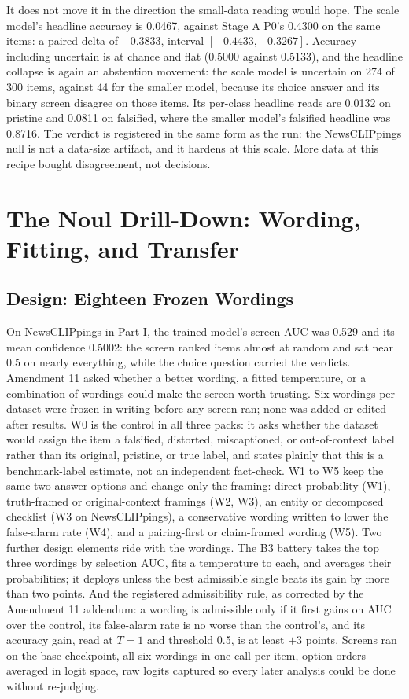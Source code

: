 \documentclass{article} %
\begin{document}
It does not move it in the direction the small-data reading would hope. The scale model's headline accuracy is 0.0467, against Stage A P0's 0.4300 on the same items: a paired delta of \(-0.3833\), interval \([-0.4433, -0.3267]\). Accuracy including uncertain is at chance and flat (0.5000 against 0.5133), and the headline collapse is again an abstention movement: the scale model is uncertain on 274 of 300 items, against 44 for the smaller model, because its choice answer and its binary screen disagree on those items. Its per-class headline reads are 0.0132 on pristine and 0.0811 on falsified, where the smaller model's falsified headline was 0.8716. The verdict is registered in the same form as the run: the NewsCLIPpings null is not a data-size artifact, and it hardens at this scale. More data at this recipe bought disagreement, not decisions.


\section{The Noul Drill-Down: Wording, Fitting, and Transfer}
\label{sec:noul}
\subsection{Design: Eighteen Frozen Wordings}
On NewsCLIPpings in Part I, the trained model's screen AUC was 0.529 and its mean confidence 0.5002: the screen ranked items almost at random and sat near 0.5 on nearly everything, while the choice question carried the verdicts. Amendment 11 asked whether a better wording, a fitted temperature, or a combination of wordings could make the screen worth trusting. Six wordings per dataset were frozen in writing before any screen ran; none was added or edited after results. W0 is the control in all three packs: it asks whether the dataset would assign the item a falsified, distorted, miscaptioned, or out-of-context label rather than its original, pristine, or true label, and states plainly that this is a benchmark-label estimate, not an independent fact-check. W1 to W5 keep the same two answer options and change only the framing: direct probability (W1), truth-framed or original-context framings (W2, W3), an entity or decomposed checklist (W3 on NewsCLIPpings), a conservative wording written to lower the false-alarm rate (W4), and a pairing-first or claim-framed wording (W5). Two further design elements ride with the wordings. The B3 battery takes the top three wordings by selection AUC, fits a temperature to each, and averages their probabilities; it deploys unless the best admissible single beats its gain by more than two points. And the registered admissibility rule, as corrected by the Amendment 11 addendum: a wording is admissible only if it first gains on AUC over the control, its false-alarm rate is no worse than the control's, and its accuracy gain, read at \(T=1\) and threshold 0.5, is at least \(+3\) points. Screens ran on the base checkpoint, all six wordings in one call per item, option orders averaged in logit space, raw logits captured so every later analysis could be done without re-judging.
\end{document}

